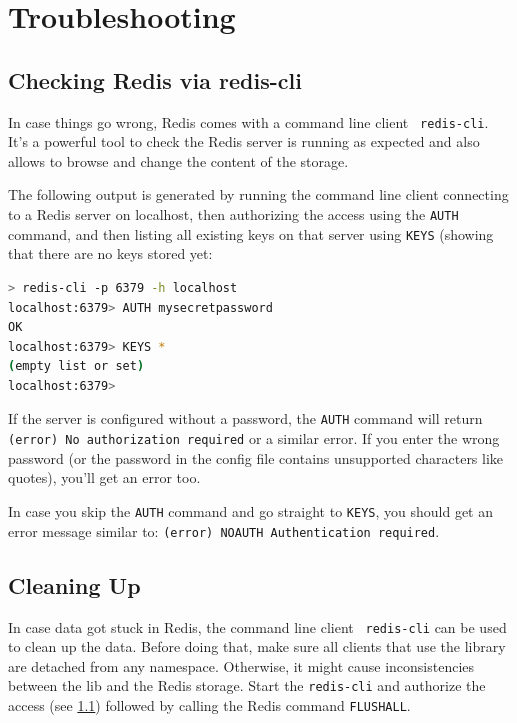 \section{Troubleshooting}
\label{sec:interface:troubleshoot}
\subsection{Checking Redis via redis-cli}
\label{sec:interface:troubleshoot:checkredis}
In case things go wrong, Redis comes with a command line client {\tt
  redis-cli}. It's a powerful tool to check the Redis server is
running as expected and also allows to browse and change the content
of the \databroker storage.

The following output is generated by running the command line client
connecting to a Redis server on localhost, then authorizing the access
using the {\tt AUTH} command, and then listing all existing keys on
that server using {\tt KEYS} (showing that there are no keys stored yet:
\begin{lstlisting}[style=mystyle,language=bash,basicstyle=\scriptsize\ttfamily,caption=Redis
  check via command line tool, label=code:rediscli]
> redis-cli -p 6379 -h localhost
localhost:6379> AUTH mysecretpassword
OK
localhost:6379> KEYS *
(empty list or set)
localhost:6379>
\end{lstlisting}

If the server is configured without a password, the {\tt AUTH} command
will return {\tt (error) No authorization required} or a similar
error.
If you enter the wrong password (or the password in the config file
contains unsupported characters like quotes), you'll get an error too.

In case you skip the {\tt AUTH} command and go straight to {\tt KEYS},
you should get an error message similar to: {\tt (error) NOAUTH
  Authentication required}.

\subsection{Cleaning Up}
In case data got stuck in Redis, the command line client {\tt
  redis-cli} can be used to clean up the data. Before doing that, make
sure all clients that use the \databroker library are detached from any
namespace. Otherwise, it might cause inconsistencies between the lib
and the Redis storage.
Start the {\tt redis-cli} and authorize the access (see
\ref{sec:interface:troubleshoot:checkredis}) followed by calling the
Redis command {\tt FLUSHALL}.


